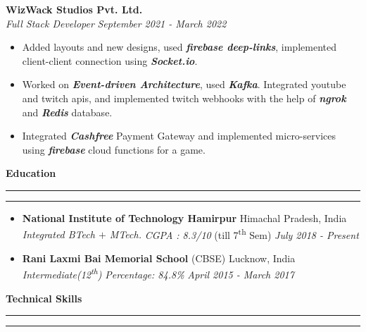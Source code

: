\documentclass[11pt]{article}
\begin{document}
    	\textbf{WizWack Studios Pvt. Ltd.}
    	\href{https://drive.google.com/file/d/14XoMt2XU2isepkzis08b2grJz6ahqw1-/view?usp=sharing}{\color{blue}}
    	\hfill
    	\\
    	\textit{Full Stack Developer}
    	\hfill
    	\textit{September 2021 - March 2022}
    	\vspace{-2pt}
    	\begin{itemize}
    		\setlength{\itemsep}{0pt}
        	\setlength{\parskip}{0pt}
        	\setlength{\parsep}{0pt}
    		\item Added layouts and new designs, used \textit{\textbf{firebase deep-links}}, implemented client-client connection using \textit{\textbf{Socket.io}}.
    		\item Worked on \textit{\textbf{Event-driven Architecture}}, used \textit{\textbf{Kafka}}. Integrated youtube and twitch apis, and implemented twitch webhooks with the help of \textit{\textbf{ngrok}} and \textit{\textbf{Redis}} database. 
    		\item Integrated \textit{\textbf{Cashfree}} Payment Gateway and implemented micro-services using \textit{\textbf{firebase}} cloud functions for a game.
    		
    	\end{itemize}
    \textbf{\large{Education}}
    	\vspace{5pt}
    	\hrule \hrule
    	\vspace{-4pt}
    	\begin{itemize}
    		\setlength{\itemsep}{4pt}
        	\setlength{\parskip}{0pt}
        	\setlength{\parsep}{4pt}
        	\item \textbf{National Institute of Technology Hamirpur} \hfill Himachal Pradesh, India\\
        	\textsl{Integrated BTech $+$ MTech.} \textit{CGPA : 8.3/10}  (till 7\textsuperscript{th} Sem)
        	\hfill 
        	\textit{July 2018 - Present}
        	\item \textbf{Rani Laxmi Bai Memorial School} (CBSE) \hfill Lucknow, India\\
        	\textsl{Intermediate(12\textsuperscript{th}) } \textit{Percentage: 84.8\%}  \hfill 
        	\textit{April 2015 - March 2017}
    	\end{itemize}
    \vspace{2pt}
    \textbf{\large{Technical Skills}}
    	\vspace{5pt}
    	\hrule \hrule
    	\vspace{4pt}
\end{document}
